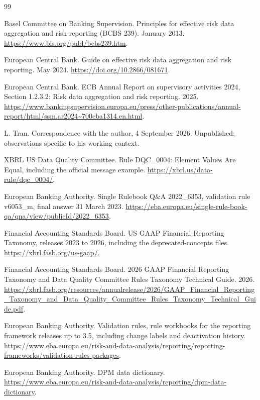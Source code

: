 \documentclass[11pt,a4paper]{article}
\begin{document}
\begin{thebibliography}{99}
\footnotesize
\setlength{\itemsep}{1pt}
\setlength{\parskip}{0pt}

 Basel Committee on Banking Supervision. Principles for effective risk data aggregation and risk reporting (BCBS 239). January 2013. \url{https://www.bis.org/publ/bcbs239.htm}.

 European Central Bank. Guide on effective risk data aggregation and risk reporting. May 2024. \url{https://doi.org/10.2866/081671}.

 European Central Bank. ECB Annual Report on supervisory activities 2024, Section 1.2.3.2: Risk data aggregation and risk reporting. 2025. \url{https://www.bankingsupervision.europa.eu/press/other-publications/annual-report/html/ssm.ar2024~700cba1314.en.html}.

 L. Tran. Correspondence with the author, 4 September 2026. Unpublished; observations specific to his working context.

 XBRL US Data Quality Committee. Rule DQC\_0004: Element Values Are Equal, including the official message example. \url{https://xbrl.us/data-rule/dqc_0004/}.

 European Banking Authority. Single Rulebook Q\&A 2022\_6353, validation rule v6053\_m, final answer 31 March 2023. \url{https://eba.europa.eu/single-rule-book-qa/qna/view/publicId/2022_6353}.

 Financial Accounting Standards Board. US GAAP Financial Reporting Taxonomy, releases 2023 to 2026, including the deprecated-concepts files. \url{https://xbrl.fasb.org/us-gaap/}.

 Financial Accounting Standards Board. 2026 GAAP Financial Reporting Taxonomy and Data Quality Committee Rules Taxonomy Technical Guide. 2026. \url{https://xbrl.fasb.org/resources/annualrelease/2026/GAAP_Financial_Reporting_Taxonomy_and_Data_Quality_Committee_Rules_Taxonomy_Technical_Guide.pdf}.

 European Banking Authority. Validation rules, rule workbooks for the reporting framework releases up to 3.5, including change labels and deactivation history. \url{https://www.eba.europa.eu/risk-and-data-analysis/reporting/reporting-frameworks/validation-rules-packages}.

 European Banking Authority. DPM data dictionary. \url{https://www.eba.europa.eu/risk-and-data-analysis/reporting/dpm-data-dictionary}.


\end{thebibliography}
\end{document}
